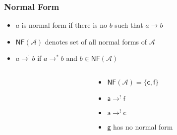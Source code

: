 \documentclass[12pt,aspectratio=169]{beamer}
\newcommand{\m}[1]{\mathsf{#1}}
\begin{document}
\begin{frame}
    \frametitle{Normal Form}
    \begin{definition}
        \begin{itemize}
            \pause
            \item $a$ is \alert{normal form} if there is no $b$ such that $a \rightarrow b$
            \pause 
            \item \alert{$\mathsf{NF}(\mathcal{A})$} denotes set of all normal forms of $\mathcal{A}$
            \pause
            \item \alert{$a \rightarrow^{!} b$} if $a \rightarrow^* b$ and $b \in \mathsf{NF}(\mathcal{A})$
        \end{itemize}
    \end{definition}
\pause
    \begin{example}
    \begin{columns}
        \begin{column}{0.35\textwidth}
            \centering
            \fig
        \end{column}
        \begin{column}{0.5\textwidth}
            \begin{itemize}
                \pause
                \item $\mathsf{NF}(\mathcal{A}) = \{\m{c}, \m{f}\}$
                \pause
                \item $\m{a} \rightarrow^! \m{f}$
                \pause
                \item $\m{a} \rightarrow^! \m{c}$
                \pause
                \item $\m{g}$ has no normal form
            \end{itemize}
        \end{column}
        \end{columns}
    \end{example}

\end{frame}
\end{document}
